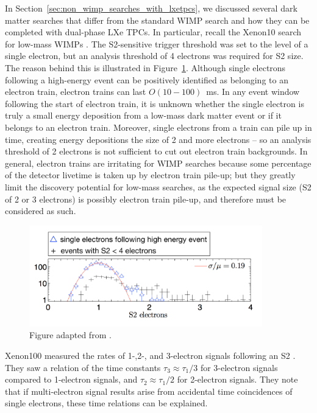 In Section~\ref{sec:non_wimp_searches_with_lxetpcs}, we discussed several dark matter searches that differ from the standard \ac{WIMP} search and how they can be completed with dual-phase \ac{LXe} \ac{TPC}s. In particular, recall the Xenon10 search for low-mass \ac{WIMP}s \cite{Angle2011}. The S2-sensitive trigger threshold was set to the level of a single electron, but an analysis threshold of 4 electrons was required for S2 size. The reason behind this is illustrated in Figure~\ref{fig:xenon10_s2s}. Although single electrons following a high-energy event can be positively identified as belonging to an electron train, electron trains can last $O(10-100)$~ms. In any event window following the start of electron train, it is unknown whether the single electron is truly a small energy deposition from a low-mass dark matter event or if it belongs to an electron train. Moreover, single electrons from a train can pile up in time, creating energy depositions the size of 2 and more electrons -- so an analysis threshold of 2 electrons is not sufficient to cut out electron train backgrounds. In general, electron trains are irritating for \ac{WIMP} searches because some percentage of the detector livetime is taken up by electron train pile-up; but they greatly limit the discovery potential for low-mass searches, as the expected signal size (S2 of 2 or 3 electrons) is possibly electron train pile-up, and therefore must be considered as such.

\begin{figure}[htbp]
\begin{center}
\includegraphics[width=0.9\textwidth]{figures/etrains/xenon10_s2s.png}
\caption{Figure adapted from \cite{Angle2011}.}
\label{fig:xenon10_s2s}
\end{center}
\end{figure}

Xenon100 measured the rates of 1-,2-, and 3-electron signals following an S2 \cite{Aprile2014}. They saw a relation of the time constants $\tau_{3} \approx \tau_{1}/3$ for 3-electron signals compared to 1-electron signals, and $\tau_{2} \approx \tau_{1}/2$ for 2-electron signals. They note that if multi-electron signal results arise from accidental time coincidences of single electrons, these time relations can be explained. 


